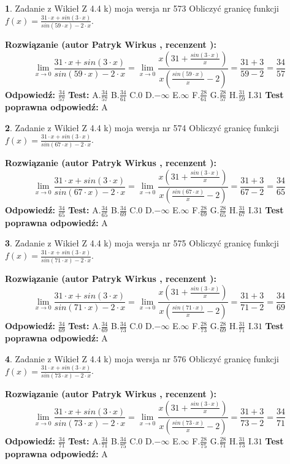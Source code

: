\documentclass[12pt, a4paper]{article}
\theoremstyle{definition} %
\newtheorem{zad}{}
\newcommand{\zadStart}[1]{\begin{zad}#1\newline}
\newcommand{\zadStop}{\end{zad}}
\newcommand{\rozwStart}[2]{\noindent \textbf{Rozwiązanie (autor #1 , recenzent #2): }\newline}
\newcommand{\rozwStop}{\newline}
\newcommand{\odpStart}{\noindent \textbf{Odpowiedź:}\newline}
\newcommand{\odpStop}{\newline}
\newcommand{\testStart}{\noindent \textbf{Test:}\newline}
\newcommand{\testStop}{\newline}
\newcommand{\kluczStart}{\noindent \textbf{Test poprawna odpowiedź:}\newline}
\newcommand{\kluczStop}{\newline}
\begin{document}
\zadStart{Zadanie z Wikieł Z 4.4 k) moja wersja nr 573}
Obliczyć granicę funkcji $f(x)=\frac{31\cdot x +sin(3\cdot x)}{sin(59\cdot x) -2\cdot x}$.
\zadStop
\rozwStart{Patryk Wirkus}{}
$$\lim\limits_{x\to 0}\frac{31\cdot x +sin(3\cdot x)}{sin(59\cdot x) -2\cdot x}
=\lim\limits_{x\to 0}\frac{x(31+\frac{sin(3\cdot x)}{x})}{x(\frac{sin(59\cdot x)}{x}-2)}
=\frac{31+3}{59-2} = \frac{34}{57}$$
\rozwStop
\odpStart
$\frac{34}{57}$
\odpStop
\testStart
A.$\frac{34}{57}$
B.$\frac{34}{61}$
C.$0$
D.$-\infty$
E.$\infty$
F.$\frac{28}{61}$
G.$\frac{28}{57}$
H.$\frac{31}{59}$
I.$31$
\testStop
\kluczStart
A
\kluczStop



\zadStart{Zadanie z Wikieł Z 4.4 k) moja wersja nr 574}
Obliczyć granicę funkcji $f(x)=\frac{31\cdot x +sin(3\cdot x)}{sin(67\cdot x) -2\cdot x}$.
\zadStop
\rozwStart{Patryk Wirkus}{}
$$\lim\limits_{x\to 0}\frac{31\cdot x +sin(3\cdot x)}{sin(67\cdot x) -2\cdot x}
=\lim\limits_{x\to 0}\frac{x(31+\frac{sin(3\cdot x)}{x})}{x(\frac{sin(67\cdot x)}{x}-2)}
=\frac{31+3}{67-2} = \frac{34}{65}$$
\rozwStop
\odpStart
$\frac{34}{65}$
\odpStop
\testStart
A.$\frac{34}{65}$
B.$\frac{34}{69}$
C.$0$
D.$-\infty$
E.$\infty$
F.$\frac{28}{69}$
G.$\frac{28}{65}$
H.$\frac{31}{67}$
I.$31$
\testStop
\kluczStart
A
\kluczStop



\zadStart{Zadanie z Wikieł Z 4.4 k) moja wersja nr 575}
Obliczyć granicę funkcji $f(x)=\frac{31\cdot x +sin(3\cdot x)}{sin(71\cdot x) -2\cdot x}$.
\zadStop
\rozwStart{Patryk Wirkus}{}
$$\lim\limits_{x\to 0}\frac{31\cdot x +sin(3\cdot x)}{sin(71\cdot x) -2\cdot x}
=\lim\limits_{x\to 0}\frac{x(31+\frac{sin(3\cdot x)}{x})}{x(\frac{sin(71\cdot x)}{x}-2)}
=\frac{31+3}{71-2} = \frac{34}{69}$$
\rozwStop
\odpStart
$\frac{34}{69}$
\odpStop
\testStart
A.$\frac{34}{69}$
B.$\frac{34}{73}$
C.$0$
D.$-\infty$
E.$\infty$
F.$\frac{28}{73}$
G.$\frac{28}{69}$
H.$\frac{31}{71}$
I.$31$
\testStop
\kluczStart
A
\kluczStop



\zadStart{Zadanie z Wikieł Z 4.4 k) moja wersja nr 576}
Obliczyć granicę funkcji $f(x)=\frac{31\cdot x +sin(3\cdot x)}{sin(73\cdot x) -2\cdot x}$.
\zadStop
\rozwStart{Patryk Wirkus}{}
$$\lim\limits_{x\to 0}\frac{31\cdot x +sin(3\cdot x)}{sin(73\cdot x) -2\cdot x}
=\lim\limits_{x\to 0}\frac{x(31+\frac{sin(3\cdot x)}{x})}{x(\frac{sin(73\cdot x)}{x}-2)}
=\frac{31+3}{73-2} = \frac{34}{71}$$
\rozwStop
\odpStart
$\frac{34}{71}$
\odpStop
\testStart
A.$\frac{34}{71}$
B.$\frac{34}{75}$
C.$0$
D.$-\infty$
E.$\infty$
F.$\frac{28}{75}$
G.$\frac{28}{71}$
H.$\frac{31}{73}$
I.$31$
\testStop
\kluczStart
A
\kluczStop
\end{document}
